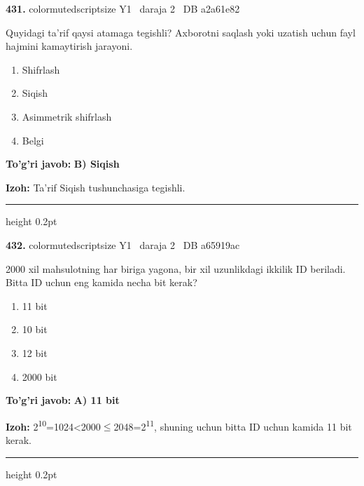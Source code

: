 \documentclass[10pt,a4paper,oneside]{article}
\begin{document}
\noindent\textbf{\color{ink}431.}  {color{muted}scriptsize Y1 \textbullet\ daraja 2 \textbullet\ DB a2a61e82}
\par
Quyidagi ta'rif qaysi atamaga tegishli? Axborotni saqlash yoki uzatish uchun fayl hajmini kamaytirish jarayoni.
\begin{enumerate}[label=\Alph*),leftmargin=9mm]
\item Shifrlash
\item Siqish
\item Asimmetrik shifrlash
\item Belgi
\end{enumerate}
\begin{tcolorbox}[enhanced,breakable,colback=teal!4,colframe=teal!50!black,boxrule=0.5pt,arc=1.1mm,left=3mm,right=3mm,top=1.7mm,bottom=1.7mm,before skip=2mm,after skip=2mm]
\textbf{\color{teal}To'g'ri javob:} \textbf{B) Siqish}
\par\smallskip
\textbf{Izoh:} Ta'rif Siqish tushunchasiga tegishli.
\end{tcolorbox}
\vspace{2mm}\hrule height 0.2pt \vspace{3mm}

\noindent\textbf{\color{ink}432.}  {color{muted}scriptsize Y1 \textbullet\ daraja 2 \textbullet\ DB a65919ac}
\par
2000 xil mahsulotning har biriga yagona, bir xil uzunlikdagi ikkilik ID beriladi. Bitta ID uchun eng kamida necha bit kerak?
\begin{enumerate}[label=\Alph*),leftmargin=9mm]
\item 11 bit
\item 10 bit
\item 12 bit
\item 2000 bit
\end{enumerate}
\begin{tcolorbox}[enhanced,breakable,colback=teal!4,colframe=teal!50!black,boxrule=0.5pt,arc=1.1mm,left=3mm,right=3mm,top=1.7mm,bottom=1.7mm,before skip=2mm,after skip=2mm]
\textbf{\color{teal}To'g'ri javob:} \textbf{A) 11 bit}
\par\smallskip
\textbf{Izoh:} 2\textsuperscript{1}\textsuperscript{0}=1024\textless{}2000\ensuremath{\leq}2048=2\textsuperscript{1}\textsuperscript{1}, shuning uchun bitta ID uchun kamida 11 bit kerak.
\end{tcolorbox}
\vspace{2mm}\hrule height 0.2pt \vspace{3mm}
\end{document}

